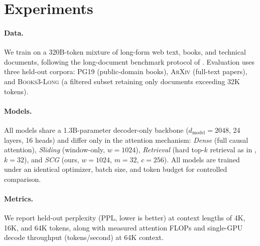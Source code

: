 \section{Experiments}
\label{sec:experiments}

\paragraph{Data.} We train on a 320B-token mixture of long-form web text,
books, and technical documents, following the long-document benchmark
protocol of \cite{castellano2018benchmark}. Evaluation uses three held-out
corpora: \textsc{PG19} (public-domain books), \textsc{ArXiv} (full-text
papers), and \textsc{Books3-Long} (a filtered subset retaining only documents
exceeding 32K tokens).

\paragraph{Models.} All models share a 1.3B-parameter decoder-only backbone
($d_{\text{model}}=2048$, 24 layers, 16 heads) and differ only in the
attention mechanism: \emph{Dense} (full causal attention), \emph{Sliding}
(window-only, $w=1024$), \emph{Retrieval} (hard top-$k$ retrieval as in
\cite{park2022retrieval}, $k=32$), and \emph{SCG} (ours, $w=1024$, $m=32$,
$c=256$). All models are trained under an identical optimizer, batch size,
and token budget for controlled comparison.

\paragraph{Metrics.} We report held-out perplexity (PPL, lower is better) at
context lengths of 4K, 16K, and 64K tokens, along with measured attention
FLOPs and single-GPU decode throughput (tokens/second) at 64K context.

